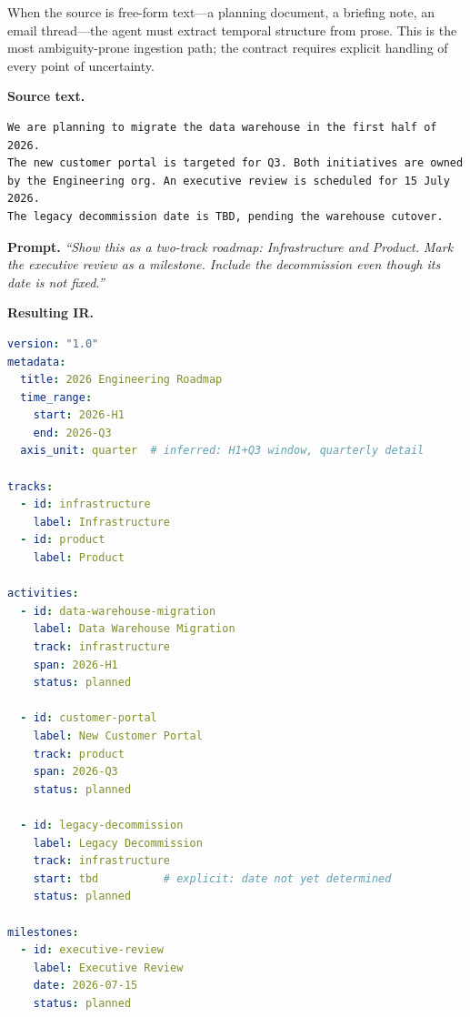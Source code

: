 When the source is free-form text---a planning document, a briefing note, an email
thread---the agent must extract temporal structure from prose. This is the most
ambiguity-prone ingestion path; the contract requires explicit handling of every point
of uncertainty.

\textbf{Source text.}

\begin{lstlisting}[caption={Natural language source}]
We are planning to migrate the data warehouse in the first half of 2026.
The new customer portal is targeted for Q3. Both initiatives are owned
by the Engineering org. An executive review is scheduled for 15 July 2026.
The legacy decommission date is TBD, pending the warehouse cutover.
\end{lstlisting}

\textbf{Prompt.} \textit{``Show this as a two-track roadmap: Infrastructure and Product.
Mark the executive review as a milestone. Include the decommission even though its date
is not fixed.''}

\textbf{Resulting IR.}

\begin{lstlisting}[language=yaml,caption={IR produced from natural language prose}]
version: "1.0"
metadata:
  title: 2026 Engineering Roadmap
  time_range:
    start: 2026-H1
    end: 2026-Q3
  axis_unit: quarter  # inferred: H1+Q3 window, quarterly detail

tracks:
  - id: infrastructure
    label: Infrastructure
  - id: product
    label: Product

activities:
  - id: data-warehouse-migration
    label: Data Warehouse Migration
    track: infrastructure
    span: 2026-H1
    status: planned

  - id: customer-portal
    label: New Customer Portal
    track: product
    span: 2026-Q3
    status: planned

  - id: legacy-decommission
    label: Legacy Decommission
    track: infrastructure
    start: tbd          # explicit: date not yet determined
    status: planned

milestones:
  - id: executive-review
    label: Executive Review
    date: 2026-07-15
    status: planned
\end{lstlisting}

